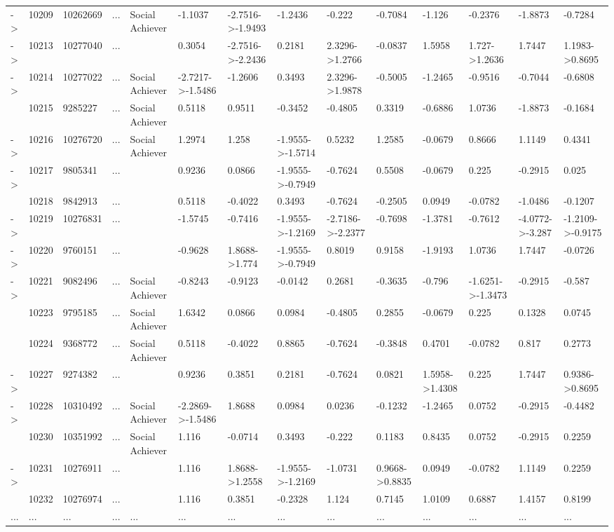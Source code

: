 \documentclass[6pt,a4paper]{article}
\begin{document}
\begin{landscape}
{\begin{longtable}{llllllllllllll}
-\textgreater &10209&10262669&...&Social Achiever&-1.1037&-2.7516-\textgreater -1.9493&-1.2436&-0.222&-0.7084&-1.126&-0.2376&-1.8873&-0.7284\tabularnewline
-\textgreater &10213&10277040&...&&0.3054&-2.7516-\textgreater -2.2436&0.2181&2.3296-\textgreater 1.2766&-0.0837&1.5958&1.727-\textgreater 1.2636&1.7447&1.1983-\textgreater 0.8695\tabularnewline
-\textgreater &10214&10277022&...&Social Achiever&-2.7217-\textgreater -1.5486&-1.2606&0.3493&2.3296-\textgreater 1.9878&-0.5005&-1.2465&-0.9516&-0.7044&-0.6808\tabularnewline
&10215&9285227&...&Social Achiever&0.5118&0.9511&-0.3452&-0.4805&0.3319&-0.6886&1.0736&-1.8873&-0.1684\tabularnewline
-\textgreater &10216&10276720&...&Social Achiever&1.2974&1.258&-1.9555-\textgreater -1.5714&0.5232&1.2585&-0.0679&0.8666&1.1149&0.4341\tabularnewline
-\textgreater &10217&9805341&...&&0.9236&0.0866&-1.9555-\textgreater -0.7949&-0.7624&0.5508&-0.0679&0.225&-0.2915&0.025\tabularnewline
&10218&9842913&...&&0.5118&-0.4022&0.3493&-0.7624&-0.2505&0.0949&-0.0782&-1.0486&-0.1207\tabularnewline
-\textgreater &10219&10276831&...&&-1.5745&-0.7416&-1.9555-\textgreater -1.2169&-2.7186-\textgreater -2.2377&-0.7698&-1.3781&-0.7612&-4.0772-\textgreater -3.287&-1.2109-\textgreater -0.9175\tabularnewline
-\textgreater &10220&9760151&...&&-0.9628&1.8688-\textgreater 1.774&-1.9555-\textgreater -0.7949&0.8019&0.9158&-1.9193&1.0736&1.7447&-0.0726\tabularnewline
-\textgreater &10221&9082496&...&Social Achiever&-0.8243&-0.9123&-0.0142&0.2681&-0.3635&-0.796&-1.6251-\textgreater -1.3473&-0.2915&-0.587\tabularnewline
&10223&9795185&...&Social Achiever&1.6342&0.0866&0.0984&-0.4805&0.2855&-0.0679&0.225&0.1328&0.0745\tabularnewline
&10224&9368772&...&Social Achiever&0.5118&-0.4022&0.8865&-0.7624&-0.3848&0.4701&-0.0782&0.817&0.2773\tabularnewline
-\textgreater &10227&9274382&...&&0.9236&0.3851&0.2181&-0.7624&0.0821&1.5958-\textgreater 1.4308&0.225&1.7447&0.9386-\textgreater 0.8695\tabularnewline
-\textgreater &10228&10310492&...&Social Achiever&-2.2869-\textgreater -1.5486&1.8688&0.0984&0.0236&-0.1232&-1.2465&0.0752&-0.2915&-0.4482\tabularnewline
&10230&10351992&...&Social Achiever&1.116&-0.0714&0.3493&-0.222&0.1183&0.8435&0.0752&-0.2915&0.2259\tabularnewline
-\textgreater &10231&10276911&...&&1.116&1.8688-\textgreater 1.2558&-1.9555-\textgreater -1.2169&-1.0731&0.9668-\textgreater 0.8835&0.0949&-0.0782&1.1149&0.2259\tabularnewline
&10232&10276974&...&&1.116&0.3851&-0.2328&1.124&0.7145&1.0109&0.6887&1.4157&0.8199\tabularnewline
...&...&...&...&...&...&...&...&...&...&...&...&...&...\tabularnewline
\hline
\end{longtable}}

\end{landscape}
\end{document}
